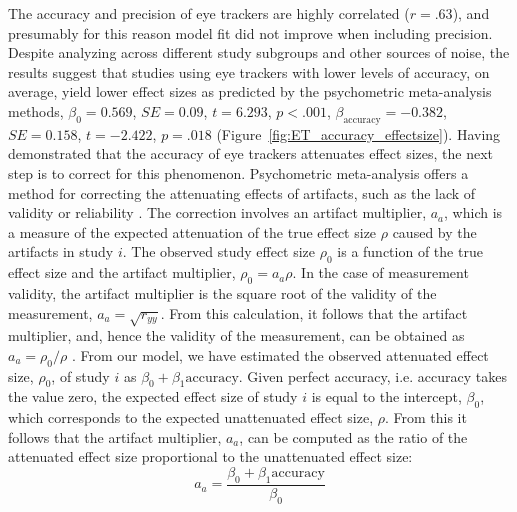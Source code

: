 \documentclass{article}
\newcommand{\SE}{\mathit{SE}}
\begin{document}
The accuracy and precision of eye trackers are highly correlated ($r = .63$), and presumably for this reason model fit did not improve when including precision. Despite analyzing across different study subgroups and other sources of noise, the results suggest that studies using eye trackers with lower levels of accuracy, on average, yield lower effect sizes as predicted by the psychometric meta-analysis methods, $\beta_0 = 0.569$, $\SE = 0.09$, $t = 6.293$, $p < .001$, $\beta_{\textrm{accuracy}} = -0.382$, $\SE = 0.158$, $t = -2.422$, $p = .018$ (Figure~\ref{fig:ET_accuracy_effectsize}). Having demonstrated that the accuracy of eye trackers attenuates effect sizes, the next step is to correct for this phenomenon. Psychometric meta-analysis offers a method for correcting the attenuating effects of artifacts, such as the lack of validity or reliability \citep{hunter2004a}. The correction involves an artifact multiplier, $a_a$, which is a measure of the expected attenuation of the true effect size $\rho$ caused by the artifacts in study $i$. The observed study effect size $\rho_0$ is a function of the true effect size and the artifact multiplier, $\rho_0 = a_a \rho$. In the case of measurement validity, the artifact multiplier is the square root of the validity of the measurement, $a_a = \sqrt{r_{yy}}$. From this calculation, it follows that the artifact multiplier, and, hence the validity of the measurement, can be obtained as $a_a = \rho_0 / \rho$ \citep{hunter2004a}. From our model, we have estimated the observed attenuated effect size, $\rho_0$, of study $i$ as $\beta_0 + \beta_1 \textrm{accuracy}$. Given perfect accuracy, i.e. accuracy takes the value zero, the expected effect size of study $i$ is equal to the intercept, $\beta_0$, which corresponds to the expected unattenuated effect size, $\rho$. From this it follows that the artifact multiplier, $a_a$, can be computed as the ratio of the attenuated effect size proportional to the unattenuated effect size:
%
\begin{equation}
\label{eq:artifact_multiplier}
a_a = \frac{\beta_0 + \beta_1 \textrm{accuracy}}{\beta_0}
\end{equation}
\end{document}

